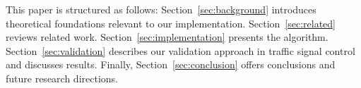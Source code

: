 This paper is structured as follows: Section~\ref{sec:background} introduces theoretical foundations relevant to our implementation. Section~\ref{sec:related} reviews related work. Section~\ref{sec:implementation} presents the \adaptiverl algorithm. Section~\ref{sec:validation} describes our validation approach in traffic signal control and discusses results. Finally, Section~\ref{sec:conclusion} offers conclusions and future research directions.





\endinput

